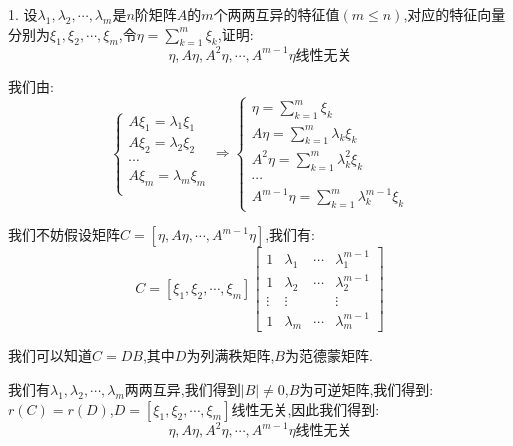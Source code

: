 1. 设$\lambda_{1},\lambda_{2},\cdots,\lambda_{m}$是$n$阶矩阵$A$的$m$个两两互异的特征值$(m\leq n)$,对应的特征向量分别为$\xi_{1},\xi_{2},\cdots,\xi_{m}$,令$\eta=\sum\limits_{k=1}^{m}\xi_{k}$,证明: $$\eta,A\eta,A^2\eta,\cdots,A^{m-1}\eta\text{线性无关}$$
\begin{solution}
	
	我们由: 
	$$\left\lbrace
	\begin{array}{l}
		A\xi_{1}=\lambda_{1}\xi_{1}\\
		A\xi_{2}=\lambda_{2}\xi_{2}\\
		\cdots\\
		A\xi_{m}=\lambda_{m}\xi_{m}\\
	\end{array}
	\right. \Rightarrow \left\lbrace
	\begin{array}{l}
		\eta=\sum\limits_{k=1}^{m}\xi_{k}\\
		A\eta=\sum\limits_{k=1}^{m}\lambda_{k}\xi_{k}\\
		A^2\eta=\sum\limits_{k=1}^{m}\lambda_{k}^{2}\xi_{k}\\
		\cdots\\
		A^{m-1}\eta=\sum\limits_{k=1}^{m}\lambda_{k}^{m-1}\xi_{k}
	\end{array}
	\right. $$
	
	我们不妨假设矩阵$C=[\eta,A\eta,\cdots,A^{m-1}\eta]$,我们有: 
	$$C=[\xi_{1},\xi_{2},\cdots,\xi_{m}]\left[ \begin{matrix}
		1&\lambda_{1}&\cdots&\lambda_{1}^{m-1}\\
		1&\lambda_{2}&\cdots&\lambda_{2}^{m-1}\\
		\vdots&\vdots& &\vdots\\
		1&\lambda_{m}&\cdots&\lambda_{m}^{m-1}
	\end{matrix}\right] $$
	
	我们可以知道$C=DB$,其中$D$为列满秩矩阵,$B$为范德蒙矩阵.
	
	我们有$\lambda_{1},\lambda_{2},\cdots,\lambda_{m}$两两互异,我们得到$|B|\neq 0$,$B$为可逆矩阵,我们得到: $r(C)=r(D)$,$D=[\xi_{1},\xi_{2},\cdots,\xi_{m}]$线性无关,因此我们得到: 
	$$\eta,A\eta,A^2\eta,\cdots,A^{m-1}\eta\text{线性无关}$$
\end{solution}

